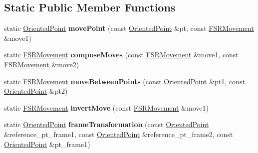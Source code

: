 \subsection*{Static Public Member Functions}
\begin{DoxyCompactItemize}
\item 
\mbox{\label{classGMapping_1_1FSRMovement_a403a350cef0a0e1aa87f9ce5c58d77e2}} 
static \hyperlink{structGMapping_1_1orientedpoint}{Oriented\+Point} {\bfseries move\+Point} (const \hyperlink{structGMapping_1_1orientedpoint}{Oriented\+Point} \&pt, const \hyperlink{classGMapping_1_1FSRMovement}{F\+S\+R\+Movement} \&move1)
\item 
\mbox{\label{classGMapping_1_1FSRMovement_a72c03093e67db102fed68403050ccf37}} 
static \hyperlink{classGMapping_1_1FSRMovement}{F\+S\+R\+Movement} {\bfseries compose\+Moves} (const \hyperlink{classGMapping_1_1FSRMovement}{F\+S\+R\+Movement} \&move1, const \hyperlink{classGMapping_1_1FSRMovement}{F\+S\+R\+Movement} \&move2)
\item 
\mbox{\label{classGMapping_1_1FSRMovement_a9fcfacb79a7c428474355ec385983b00}} 
static \hyperlink{classGMapping_1_1FSRMovement}{F\+S\+R\+Movement} {\bfseries move\+Between\+Points} (const \hyperlink{structGMapping_1_1orientedpoint}{Oriented\+Point} \&pt1, const \hyperlink{structGMapping_1_1orientedpoint}{Oriented\+Point} \&pt2)
\item 
\mbox{\label{classGMapping_1_1FSRMovement_aaa0400eaa46dc818755834215539652c}} 
static \hyperlink{classGMapping_1_1FSRMovement}{F\+S\+R\+Movement} {\bfseries invert\+Move} (const \hyperlink{classGMapping_1_1FSRMovement}{F\+S\+R\+Movement} \&move1)
\item 
\mbox{\label{classGMapping_1_1FSRMovement_a6ff44fef668a82d5013a0b547d4357b9}} 
static \hyperlink{structGMapping_1_1orientedpoint}{Oriented\+Point} {\bfseries frame\+Transformation} (const \hyperlink{structGMapping_1_1orientedpoint}{Oriented\+Point} \&reference\+\_\+pt\+\_\+frame1, const \hyperlink{structGMapping_1_1orientedpoint}{Oriented\+Point} \&reference\+\_\+pt\+\_\+frame2, const \hyperlink{structGMapping_1_1orientedpoint}{Oriented\+Point} \&pt\+\_\+frame1)
\end{DoxyCompactItemize}
